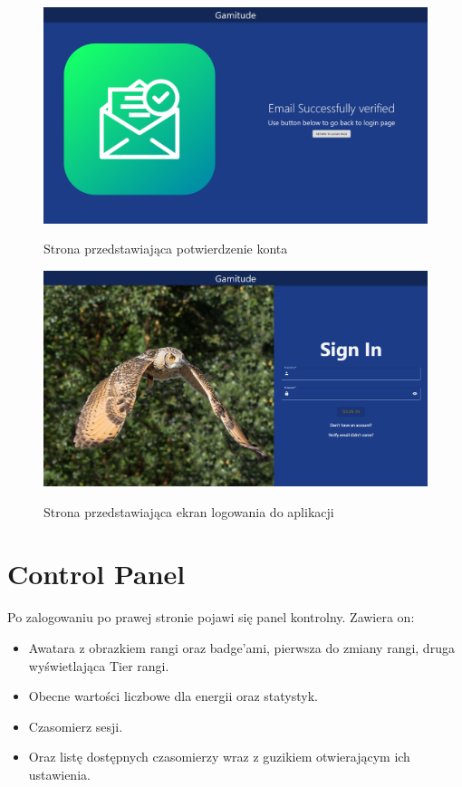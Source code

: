 \documentclass[a4paper,11pt]{report}
\begin{document}
\begin{figure}[H]
	\centering
	\includegraphics[scale=0.3]{prezentacja/Confirmed_Email}\\
	\caption{Strona przedstawiająca potwierdzenie konta}
	\label{fig:Confirmed_Email}
\end{figure}
\begin{figure}[H]
	\centering
	\includegraphics[scale=0.3]{prezentacja/Login}\\
	\caption{Strona przedstawiająca ekran logowania do aplikacji}
	\label{fig:Login}
\end{figure}
\section{Control Panel}
Po zalogowaniu po prawej stronie pojawi się panel kontrolny.
Zawiera on:
\begin{itemize}
	\item Awatara z obrazkiem rangi oraz badge'ami, pierwsza do zmiany rangi, druga wyświetlająca Tier rangi. 
	\item Obecne wartości liczbowe dla energii oraz statystyk.
	\item Czasomierz sesji.
	\item Oraz listę dostępnych czasomierzy wraz z guzikiem otwierającym ich ustawienia.
\end{itemize}
\end{document}
